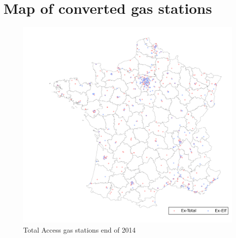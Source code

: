 \documentclass[english]{article}
\begin{document}
\newpage



\newpage

\appendix

\section*{Map of converted gas stations}

\begin{figure}[H]
	\centering
		\includegraphics[width=16cm]{graphs/map_total_access.png}
\caption{Total Access gas stations end of 2014}
\label{figure:map_ta}
\end{figure}
\end{document}
